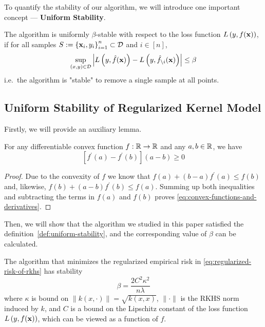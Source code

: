 To quantify the stability of our algorithm, we will introduce one important concept --- \textbf{Uniform Stability}.
\begin{definition}
	\label{def:uniform-stability}
	The algorithm is uniformly $\beta$-stable with respect to the loss function $L\left(y,f({\bf x})\right)$, if for all samples $S:=\left\{{\bf x}_{i},y_{i}\right\}_{i=1}^{n}\subset\mathcal{D}$ and $i\in[n]$,
	\begin{equation}
		\sup_{(x,y)\in\mathcal{D}}\left|L\left(y,\hat{f}({\bf x})\right)-L\left(y,\hat{f}_{\backslash i}({\bf x})\right)\right|\leq\beta
	\end{equation}
	i.e.\ the algorithm is "stable" to remove a single sample at all points.
\end{definition}

\subsection{Uniform Stability of Regularized Kernel Model}

Firstly, we will provide an auxiliary lemma.

\begin{lemma} \label{lem:convex-functions-and-derivatives}
	For any differentiable convex function $f:{\mathbb R}\rightarrow{\mathbb R}$ and any $a,b\in{\mathbb R}$, we have
	\begin{equation}
		\label{eq:convex-functions-and-derivatives}
		\left[f^{\prime}(a)-f^{\prime}(b)\right](a-b)\geq 0
	\end{equation}
\end{lemma}

\begin{proof}
	Due to the convexity of $f$ we know that $f(a)+(b-a) f^{\prime}(a) \leq f(b)$ and, likewise, $f(b)+(a-b) f^{\prime}(b) \leq f(a)$. Summing up both inequalities and subtracting the terms in $f(a)$ and $f(b)$ proves \eqref{eq:convex-functions-and-derivatives}.
\end{proof}

Then, we will show that the algorithm we studied in this paper satisfied the definition~\ref{def:uniform-stability}, and the corresponding value of $\beta$ can be calculated.

\begin{theorem}
	\label{thm:algorithmic-stability-of-risk-minimizers}
	The algorithm that minimizes the regularized empirical risk in \eqref{eq:regularized-risk-of-rkhs} has stability
	\begin{equation}
		\beta=\frac{2C^{2}\kappa^{2}}{n\lambda}
	\end{equation}
	where $\kappa$ is bound on $\|k(x,\cdot)\|=\sqrt{k(x,x)}$, $\|\cdot\|$ is the RKHS norm induced by $k$, and $C$ is a bound on the Lipschitz constant of the loss function $L\left(y,f({\bf x})\right)$, which can be viewed as a function of $f$.
\end{theorem}

